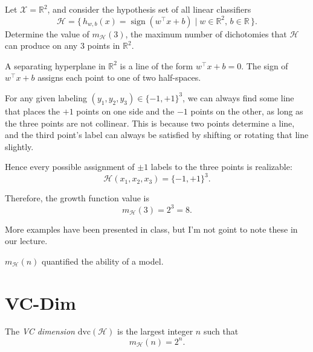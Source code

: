\documentclass[../main]{subfiles}
\begin{document}
\begin{example}
    Let $\mathcal{X} = \mathbb{R}^2$, and consider the hypothesis set of all linear classifiers
    \begin{equation}
        \mathcal{H} = \{\, h_{w,b}(x) = \operatorname{sign}(w^\top x + b) \mid w \in \mathbb{R}^2,\, b \in \mathbb{R} \,\}.
    \end{equation}
    Determine the value of $m_{\mathcal{H}}(3)$, the maximum number of dichotomies that $\mathcal{H}$
    can produce on any $3$ points in $\mathbb{R}^2$.
\end{example}
\begin{solution}
    

A separating hyperplane in $\mathbb{R}^2$ is a line of the form $w^\top x + b = 0$.  
The sign of $w^\top x + b$ assigns each point to one of two half-spaces.
 
For any given labeling $(y_1,y_2,y_3)\in\{-1,+1\}^3$,  
we can always find some line that places the $+1$ points on one side and the $-1$ points on the other,  
as long as the three points are not collinear.  
This is because two points determine a line, and the third point’s label can always be satisfied
by shifting or rotating that line slightly.

Hence every possible assignment of $\pm1$ labels to the three points is realizable:
\begin{equation}
    \mathcal{H}(x_1,x_2,x_3)
    = \{-1,+1\}^3.
\end{equation}

Therefore, the growth function value is
\begin{equation}
    m_{\mathcal{H}}(3) = 2^3 = 8.
\end{equation}
\end{solution}
\begin{remark}
    More examples have been presented in class, but I'm not goint to note these in our lecture.
\end{remark}
$m_{\mathcal H}(n)$ quantified the ability of a model.
\section{VC-Dim}

\begin{definition}
The \emph{VC dimension} $\mathrm{dvc}(\mathcal{H})$ is the largest integer $n$ such that
\begin{equation}
    m_{\mathcal{H}}(n) = 2^n.
\end{equation}
\end{definition}
\end{document}
